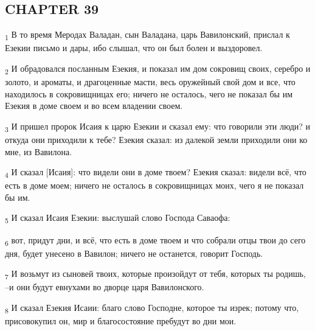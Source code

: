 \subsection{CHAPTER 39}
\begin{tcolorbox}
\textsubscript{1} В то время Меродах Валадан, сын Валадана, царь Вавилонский, прислал к Езекии письмо и дары, ибо слышал, что он был болен и выздоровел.
\end{tcolorbox}
\begin{tcolorbox}
\textsubscript{2} И обрадовался посланным Езекия, и показал им дом сокровищ своих, серебро и золото, и ароматы, и драгоценные масти, весь оружейный свой дом и все, что находилось в сокровищницах его; ничего не осталось, чего не показал бы им Езекия в доме своем и во всем владении своем.
\end{tcolorbox}
\begin{tcolorbox}
\textsubscript{3} И пришел пророк Исаия к царю Езекии и сказал ему: что говорили эти люди? и откуда они приходили к тебе? Езекия сказал: из далекой земли приходили они ко мне, из Вавилона.
\end{tcolorbox}
\begin{tcolorbox}
\textsubscript{4} И сказал [Исаия]: что видели они в доме твоем? Езекия сказал: видели всё, что есть в доме моем; ничего не осталось в сокровищницах моих, чего я не показал бы им.
\end{tcolorbox}
\begin{tcolorbox}
\textsubscript{5} И сказал Исаия Езекии: выслушай слово Господа Саваофа:
\end{tcolorbox}
\begin{tcolorbox}
\textsubscript{6} вот, придут дни, и всё, что есть в доме твоем и что собрали отцы твои до сего дня, будет унесено в Вавилон; ничего не останется, говорит Господь.
\end{tcolorbox}
\begin{tcolorbox}
\textsubscript{7} И возьмут из сыновей твоих, которые произойдут от тебя, которых ты родишь, --и они будут евнухами во дворце царя Вавилонского.
\end{tcolorbox}
\begin{tcolorbox}
\textsubscript{8} И сказал Езекия Исаии: благо слово Господне, которое ты изрек; потому что, присовокупил он, мир и благосостояние пребудут во дни мои.
\end{tcolorbox}
